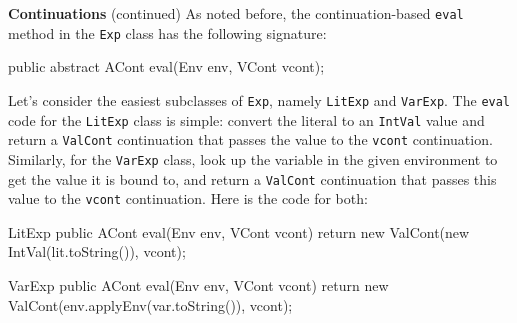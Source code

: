 \begin{minipage}[t]{\sw}
\slidenumber
\LARGE
{\bf Continuations} (continued)\exx
As noted before,
the continuation-based \verb'eval' method in the \verb'Exp' class
has the following signature:
\Large
\begin{qv}
public abstract ACont eval(Env env, VCont vcont);
\end{qv}
\LARGE
Let's consider the easiest subclasses of \verb'Exp',
namely \verb'LitExp' and \verb'VarExp'.
The \verb'eval' code for the \verb'LitExp' class is simple:
convert the literal to an \verb'IntVal' value
and return a \verb'ValCont' continuation
that passes the value to the \verb'vcont' continuation.
Similarly, for the \verb'VarExp' class,
look up the variable in the given environment
to get the value it is bound to,
and return a \verb'ValCont' continuation
that passes this value to the \verb'vcont' continuation.
Here is the code for both:
\Large
\begin{qv}
LitExp
    public ACont eval(Env env, VCont vcont) {
        return new ValCont(new IntVal(lit.toString()), vcont);
    }

VarExp
    public ACont eval(Env env, VCont vcont) {
        return new ValCont(env.applyEnv(var.toString()), vcont);
    }
\end{qv}
\Large
\end{minipage}
